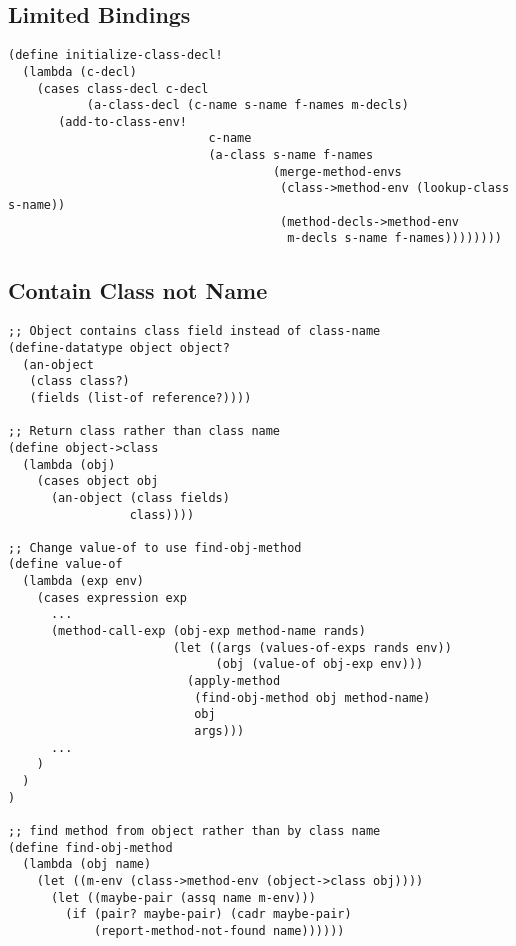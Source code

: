 \documentclass[../main.tex]{subfiles}
\begin{document}
\subsection{Limited Bindings}

\begin{lstlisting}
(define initialize-class-decl!
  (lambda (c-decl)
    (cases class-decl c-decl
           (a-class-decl (c-name s-name f-names m-decls)
       (add-to-class-env!
                            c-name
                            (a-class s-name f-names
                                     (merge-method-envs
                                      (class->method-env (lookup-class s-name))
                                      (method-decls->method-env
                                       m-decls s-name f-names))))))))
\end{lstlisting}

\subsection{Contain Class not Name}

\begin{lstlisting}
;; Object contains class field instead of class-name
(define-datatype object object?
  (an-object
   (class class?)
   (fields (list-of reference?))))

;; Return class rather than class name
(define object->class
  (lambda (obj)
    (cases object obj
      (an-object (class fields)
                 class))))

;; Change value-of to use find-obj-method
(define value-of
  (lambda (exp env)
    (cases expression exp
      ...
      (method-call-exp (obj-exp method-name rands)
                       (let ((args (values-of-exps rands env))
                             (obj (value-of obj-exp env)))
                         (apply-method
                          (find-obj-method obj method-name)
                          obj
                          args)))
      ...
    )
  )
)

;; find method from object rather than by class name
(define find-obj-method
  (lambda (obj name)
    (let ((m-env (class->method-env (object->class obj))))
      (let ((maybe-pair (assq name m-env)))
        (if (pair? maybe-pair) (cadr maybe-pair)
            (report-method-not-found name))))))
\end{lstlisting}
\end{document}
